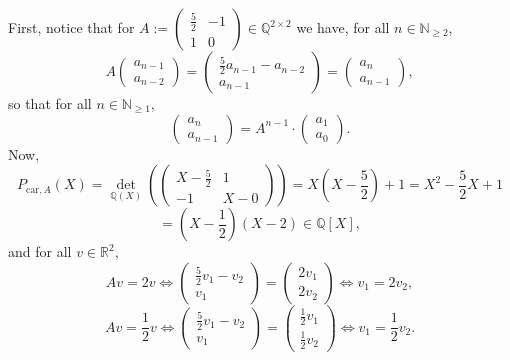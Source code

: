 \begin{solution}
    First, notice that for \( A := \begin{pmatrix} \frac{5}{2} & -1 \\ 1 & 0 \end{pmatrix} \in \mathbb{Q}^{2 \times 2} \) we have, for all \( n \in \mathbb{N}_{\geq 2} \),
    \[
        A \begin{pmatrix} a_{n-1} \\ a_{n-2} \end{pmatrix} = \begin{pmatrix} \frac{5}{2} a_{n-1} - a_{n-2} \\ a_{n-1} \end{pmatrix} = \begin{pmatrix} a_n \\ a_{n-1} \end{pmatrix},
    \]
    so that for all \( n \in \mathbb{N}_{\geq 1} \),
    \[
        \begin{pmatrix} a_n \\ a_{n-1} \end{pmatrix} = A^{n-1} \cdot \begin{pmatrix} a_1 \\ a_0
        \end{pmatrix}.
    \]
    Now,
    \[
        P_{\mathrm{car},A}\left(X\right) = {\det}_{\mathbb{Q}\left(X\right)}\left(\begin{pmatrix} X-\frac{5}{2} & 1 \\ -1 & X-0 \end{pmatrix}\right) = X\left(X-\frac{5}{2}\right)+1 = X^2-\frac{5}{2}X+1
    \]
    \[
        = \left(X-\frac{1}{2}\right)\left(X-2\right) \in \mathbb{Q}\left[X\right],
    \]
    and for all \( v \in \mathbb{R}^2 \),
    \[
        Av = 2v \Leftrightarrow \begin{pmatrix} \frac{5}{2} v_1 - v_2 \\ v_1 \end{pmatrix} = \begin{pmatrix} 2 v_1 \\ 2 v_2 \end{pmatrix} \Leftrightarrow v_1 = 2 v_2,
    \]
    \[
        Av = \frac{1}{2} v \Leftrightarrow \begin{pmatrix} \frac{5}{2} v_1 - v_2 \\ v_1 \end{pmatrix} = \begin{pmatrix} \frac{1}{2} v_1 \\ \frac{1}{2} v_2 \end{pmatrix} \Leftrightarrow v_1 = \frac{1}{2} v_2.
\]
\end{solution}
